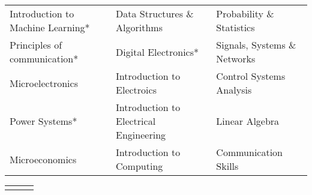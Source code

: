 \vspace{-0.2cm}

\vspace{-0.2cm}

{\fontsize{10pt}{1em}\bodyfontlight\upshape\color{text}
\begin{tabular*}{\textwidth}{L{\textwidth/3 - 0.2cm}
  L{\textwidth/3 - 0.2cm} L{\textwidth/3 - 0.2cm}}
    Introduction to Machine Learning* & Data Structures \& Algorithms   & Probability \& Statistics  \\
    Principles of communication* & Digital Electronics* & Signals, Systems \& Networks \\
    Microelectronics   & Introduction to Electroics   & Control Systems Analysis \\
    Power Systems* & Introduction to Electrical Engineering &  Linear Algebra\\
    Microeconomics  & Introduction to Computing  & Communication Skills \\
   
\end{tabular*}
\fontsize{10pt}{1em}\footerfont\upshape\color{text}
\begin{tabular*}{\textwidth}{L{8.4cm} L{3cm} L{3.5cm}}
   &  & \\
\end{tabular*}
\vspace{-6mm}
}

